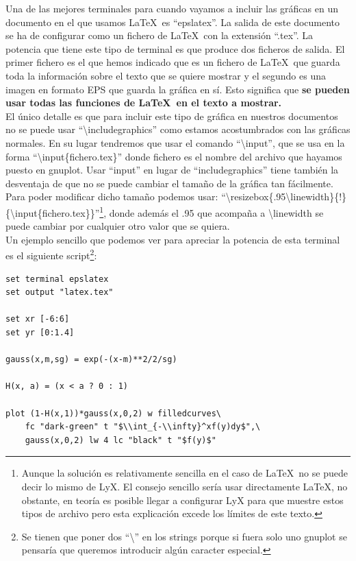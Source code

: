 \documentclass[11pt,a4paper,twoside,pdf]{article}
\numberwithin{equation}{section}
\begin{document}
Una de las mejores terminales para cuando vayamos a incluir las gráficas en un documento en el que usamos \LaTeX\ es ``epslatex''. La salida de este documento se ha de configurar como un fichero de \LaTeX\ con la extensión ``.tex''. La potencia que tiene este tipo de terminal es que produce dos ficheros de salida. El primer fichero es el que hemos indicado que es un fichero de \LaTeX\ que guarda toda la información sobre el texto que se quiere mostrar y el segundo es una imagen en formato EPS que guarda la gráfica en sí. Esto significa que \textbf{se pueden usar todas las funciones de \LaTeX\ en el texto a mostrar.} \\

El único detalle es que para incluir este tipo de gráfica en nuestros documentos no se puede usar ``\textbackslash includegraphics'' como estamos acostumbrados con las gráficas normales. En su lugar tendremos que usar el comando ``\textbackslash input'', que se usa en la forma ``\textbackslash input\{fichero.tex\}'' donde fichero es el nombre del archivo que hayamos puesto en gnuplot. Usar ``input'' en lugar de ``includegraphics'' tiene también la desventaja de que no se puede cambiar el tamaño de la gráfica tan fácilmente. Para poder modificar dicho tamaño podemos usar: ``\textbackslash resizebox\{.95\textbackslash linewidth\}\{!\}\{\textbackslash input\{fichero.tex\}\}''\footnote{Aunque la solución es relativamente sencilla en el caso de \LaTeX\ no se puede decir lo mismo de LyX. El consejo sencillo sería usar directamente \LaTeX , no obstante, en teoría es posible llegar a configurar LyX para que muestre estos tipos de archivo pero esta explicación excede los límites de este texto.}, donde además el .95 que acompaña a \textbackslash linewidth se puede cambiar por cualquier otro valor que se quiera. \\

Un ejemplo sencillo que podemos ver para apreciar la potencia de esta terminal es el siguiente script\footnote{Se tienen que poner dos ``\textbackslash'' en los strings porque si fuera solo uno gnuplot se pensaría que queremos introducir algún caracter especial.}:

\begin{lstlisting}[language=Gnuplot]
set terminal epslatex
set output "latex.tex"

set xr [-6:6]
set yr [0:1.4]

gauss(x,m,sg) = exp(-(x-m)**2/2/sg)

H(x, a) = (x < a ? 0 : 1)

plot (1-H(x,1))*gauss(x,0,2) w filledcurves\
    fc "dark-green" t "$\\int_{-\\infty}^xf(y)dy$",\
    gauss(x,0,2) lw 4 lc "black" t "$f(y)$"
\end{lstlisting}
\end{document}
